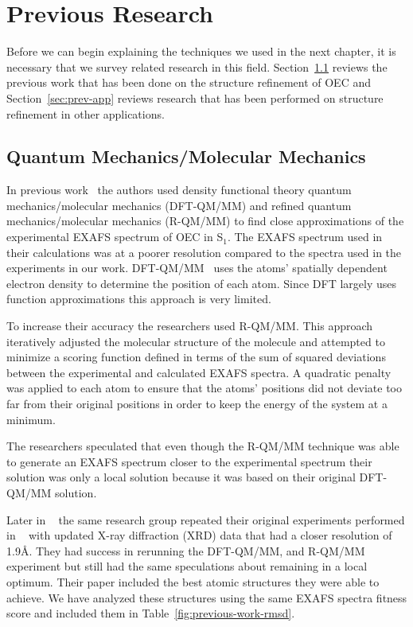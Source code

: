 \chapter{Previous Research}

Before we can begin explaining the techniques we used in the next chapter, it is necessary that we survey related research in this field. Section~\ref{sec:prev-work} reviews the previous work that has been done on the structure refinement of OEC and Section~\ref{sec:prev-app} reviews research that has been performed on structure refinement in other applications.

\section{Quantum Mechanics/Molecular Mechanics}
\label{sec:prev-work}

In previous work~\cite{sproviero2008model} the authors used density functional theory quantum mechanics/molecular mechanics (DFT-QM/MM) and refined quantum mechanics/molecular mechanics (R-QM/MM) to find close approximations of the experimental EXAFS spectrum of OEC in S$_{1}$. The EXAFS spectrum used in their calculations was at a poorer resolution compared to the spectra used in the experiments in our work. DFT-QM/MM~\cite{parr1989density} uses the atoms' spatially dependent electron density to determine the position of each atom. Since DFT largely uses function approximations this approach is very limited.

To increase their accuracy the researchers used R-QM/MM. This approach iteratively adjusted the molecular structure of the molecule and attempted to minimize a scoring function defined in terms of the sum of squared deviations between the experimental and calculated EXAFS spectra. A quadratic penalty was applied to each atom to ensure that the atoms' positions did not deviate too far from their original positions in order to keep the energy of the system at a minimum.

The researchers speculated that even though the R-QM/MM technique was able to generate an EXAFS spectrum closer to the experimental spectrum their solution was only a local solution because it was based on their original DFT-QM/MM solution.

Later in ~\cite{luber2011s1} the same research group repeated their original experiments performed in ~\cite{sproviero2008model} with updated X-ray diffraction (XRD) data that had a closer resolution of 1.9\AA. They had success in rerunning the DFT-QM/MM, and R-QM/MM experiment but still had the same speculations about remaining in a local optimum. Their paper included the best atomic structures they were able to achieve. We have analyzed these structures using the same EXAFS spectra fitness score and included them in Table~\ref{fig:previous-work-rmsd}.

